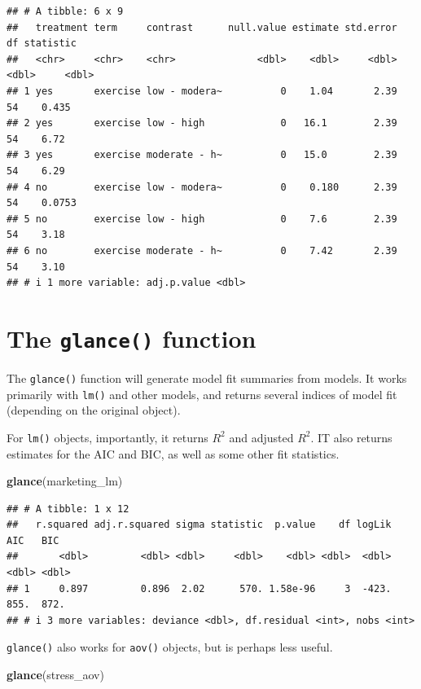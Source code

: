 \documentclass[
]{book}
\newenvironment{Shaded}{\begin{snugshade}}{\end{snugshade}}
\newcommand{\FunctionTok}[1]{\textcolor[rgb]{0.13,0.29,0.53}{\textbf{#1}}}
\newcommand{\NormalTok}[1]{#1}
\begin{document}
\begin{verbatim}
## # A tibble: 6 x 9
##   treatment term     contrast      null.value estimate std.error    df statistic
##   <chr>     <chr>    <chr>              <dbl>    <dbl>     <dbl> <dbl>     <dbl>
## 1 yes       exercise low - modera~          0    1.04       2.39    54    0.435 
## 2 yes       exercise low - high             0   16.1        2.39    54    6.72  
## 3 yes       exercise moderate - h~          0   15.0        2.39    54    6.29  
## 4 no        exercise low - modera~          0    0.180      2.39    54    0.0753
## 5 no        exercise low - high             0    7.6        2.39    54    3.18  
## 6 no        exercise moderate - h~          0    7.42       2.39    54    3.10  
## # i 1 more variable: adj.p.value <dbl>
\end{verbatim}

\section{\texorpdfstring{The \texttt{glance()} function}{The glance() function}}\label{broom-glance}

The \texttt{glance()} function will generate model fit summaries from models. It works primarily with \texttt{lm()} and other models, and returns several indices of model fit (depending on the original object).

For \texttt{lm()} objects, importantly, it returns \(R^2\) and adjusted \(R^2\). IT also returns estimates for the AIC and BIC, as well as some other fit statistics.

\begin{Shaded}
\begin{Highlighting}[]
\FunctionTok{glance}\NormalTok{(marketing\_lm)}
\end{Highlighting}
\end{Shaded}

\begin{verbatim}
## # A tibble: 1 x 12
##   r.squared adj.r.squared sigma statistic  p.value    df logLik   AIC   BIC
##       <dbl>         <dbl> <dbl>     <dbl>    <dbl> <dbl>  <dbl> <dbl> <dbl>
## 1     0.897         0.896  2.02      570. 1.58e-96     3  -423.  855.  872.
## # i 3 more variables: deviance <dbl>, df.residual <int>, nobs <int>
\end{verbatim}

\texttt{glance()} also works for \texttt{aov()} objects, but is perhaps less useful.

\begin{Shaded}
\begin{Highlighting}[]
\FunctionTok{glance}\NormalTok{(stress\_aov)}
\end{Highlighting}
\end{Shaded}
\end{document}
